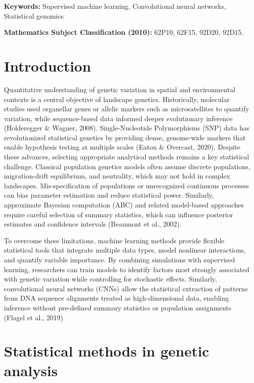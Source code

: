 \documentclass[
]{article}
\begin{document}
\textbf{Keywords:} Supervised machine learning, Convolutional neural
networks, Statistical genomics

\textbf{Mathematics Subject Classification (2010):} 62P10, 62F15, 92D20,
92D15.

\hypertarget{introduction}{%
\section{Introduction}\label{introduction}}

Quantitative understanding of genetic variation in spatial and
environmental contexts is a central objective of landscape genetics.
Historically, molecular studies used organellar genes or allelic markers
such as microsatellites to quantify variation, while sequence-based data
informed deeper evolutionary inference (Holderegger \& Wagner, 2008).
Single-Nucleotide Polymorphisms (SNP) data has revolutionized
statistical genetics by providing dense, genome-wide markers that enable
hypothesis testing at multiple scales (Eaton \& Overcast, 2020). Despite
these advances, selecting appropriate analytical methods remains a key
statistical challenge. Classical population genetics models often assume
discrete populations, migration-drift equilibrium, and neutrality, which
may not hold in complex landscapes. Mis-specification of populations or
unrecognized continuous processes can bias parameter estimation and
reduce statistical power. Similarly, approximate Bayesian computation
(ABC) and related model-based approaches require careful selection of
summary statistics, which can influence posterior estimates and
confidence intervals (Beaumont et al., 2002).

To overcome these limitations, machine learning methods provide flexible
statistical tools that integrate multiple data types, model nonlinear
interactions, and quantify variable importance. By combining simulations
with supervised learning, researchers can train models to identify
factors most strongly associated with genetic variation while
controlling for stochastic effects. Similarly, convolutional neural
networks (CNNs) allow the statistical extraction of patterns from DNA
sequence alignments treated as high-dimensional data, enabling inference
without pre-defined summary statistics or population assignments (Flagel
et al., 2019).

\hypertarget{statistical-methods-in-genetic-analysis}{%
\section{Statistical methods in genetic
analysis}\label{statistical-methods-in-genetic-analysis}}
\end{document}
